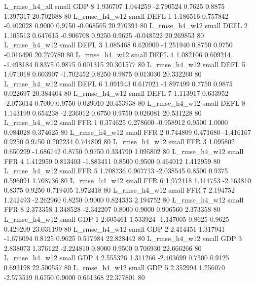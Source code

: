  L_rmse_h4_all      small      GDP                 8 1.936707 1.044259 -2.790524 0.7625 0.8875  1.397317   20.702688 80
 L_rmse_h4_w12      small     DEFL                 1 1.186516 0.757842 -0.402028 0.9000 0.9750 -0.068565   20.270391 80
 L_rmse_h4_w12      small     DEFL                 2 1.105513 0.647615 -0.906708 0.9250 0.9625 -0.048522   20.269853 80
 L_rmse_h4_w12      small     DEFL                 3 1.085468 0.620909 -1.251940 0.8750 0.9750 -0.016490   20.279780 80
 L_rmse_h4_w12      small     DEFL                 4 1.082106 0.609214 -1.498184 0.8375 0.9875  0.001315   20.301577 80
 L_rmse_h4_w12      small     DEFL                 5 1.071018 0.603907 -1.702452 0.8250 0.9875  0.013030   20.332260 80
 L_rmse_h4_w12      small     DEFL                 6 1.091943 0.617021 -1.897499 0.7750 0.9875  0.022697   20.384404 80
 L_rmse_h4_w12      small     DEFL                 7 1.113917 0.633952 -2.073014 0.7000 0.9750  0.029010   20.453938 80
 L_rmse_h4_w12      small     DEFL                 8 1.143199 0.654238 -2.236012 0.6750 0.9750  0.026081   20.531228 80
 L_rmse_h4_w12      small      FFR                 1 0.374625 0.278600 -0.958912 0.9500 1.0000  0.084028    0.374625 80
 L_rmse_h4_w12      small      FFR                 2 0.744809 0.471680 -1.416167 0.9250 0.9750  0.202234    0.744809 80
 L_rmse_h4_w12      small      FFR                 3 1.095802 0.650299 -1.686742 0.8750 0.9750  0.334790    1.095802 80
 L_rmse_h4_w12      small      FFR                 4 1.412959 0.813403 -1.883411 0.8500 0.9500  0.464012    1.412959 80
 L_rmse_h4_w12      small      FFR                 5 1.708736 0.967713 -2.038545 0.8500 0.9375  0.596091    1.708736 80
 L_rmse_h4_w12      small      FFR                 6 1.972418 1.114753 -2.163810 0.8375 0.9250  0.719405    1.972418 80
 L_rmse_h4_w12      small      FFR                 7 2.194752 1.242493 -2.262960 0.8250 0.9000  0.824333    2.194752 80
 L_rmse_h4_w12      small      FFR                 8 2.373358 1.348528 -2.342207 0.8000 0.9000  0.906560    2.373358 80
 L_rmse_h4_w12      small      GDP                 1 2.605461 1.533924 -1.147005 0.8625 0.9625  0.429209   23.031199 80
 L_rmse_h4_w12      small      GDP                 2 2.414451 1.317941 -1.676094 0.8125 0.9625  0.517984   22.828442 80
 L_rmse_h4_w12      small      GDP                 3 2.838073 1.376122 -2.224810 0.8000 0.9500  0.706930   22.666266 80
 L_rmse_h4_w12      small      GDP                 4 2.555326 1.311266 -2.403699 0.7500 0.9125  0.693198   22.500557 80
 L_rmse_h4_w12      small      GDP                 5 2.352994 1.256070 -2.573519 0.6750 0.9000  0.661368   22.377801 80
